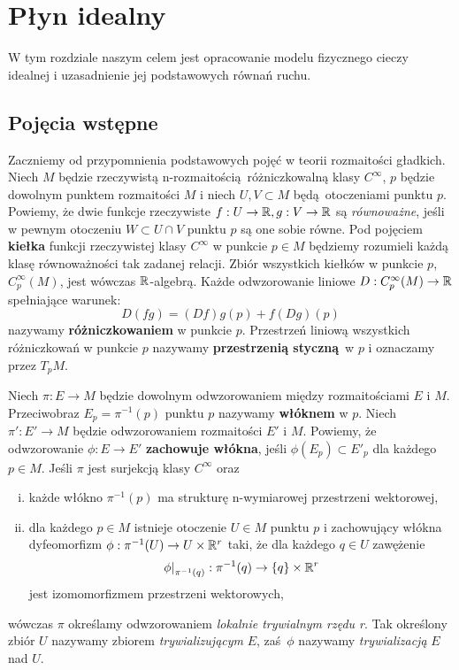 \chapter{Płyn idealny} W tym rozdziale naszym celem jest opracowanie modelu fizycznego cieczy idealnej i uzasadnienie jej podstawowych równań ruchu.

\section{Pojęcia wstępne}
Zaczniemy od przypomnienia podstawowych pojęć w teorii rozmaitości gładkich. Niech \(M\) będzie rzeczywistą n-rozmaitością różniczkowalną klasy \(C^\infty\), \(p\) będzie dowolnym punktem rozmaitości \(M\) i niech \(U, V\subset M\) będą otoczeniami punktu \(p\). Powiemy, że dwie funkcje rzeczywiste \(f:U\to\mathbb{R}, g:V\to\mathbb{R}\) są \emph{równoważne}, jeśli w pewnym otoczeniu \(W\subset U\cap V\) punktu \(p\) są one sobie równe. Pod pojęciem \textbf{kiełka} funkcji rzeczywistej klasy \(C^\infty\) w punkcie \(p\in M\) będziemy rozumieli każdą klasę równoważności tak zadanej relacji. Zbiór wszystkich kiełków w punkcie \(p\), \(C_p^\infty(M)\), jest wówczas \(\mathbb{R}\)-algebrą. Każde odwzorowanie liniowe \(D:C_p^\infty(M)\to\mathbb{R}\) spełniające warunek:
\begin{equation}
D(fg) = (Df)g(p) + f(Dg)(p)
\end{equation}
nazywamy \textbf{różniczkowaniem} w punkcie \(p\). Przestrzeń liniową wszystkich różniczkowań w punkcie \(p\) nazywamy \textbf{przestrzenią styczną} w \(p\) i oznaczamy przez \(T_pM\).

Niech \(\pi: E\to M\) będzie dowolnym odwzorowaniem między rozmaitościami \(E\) i \(M\). Przeciwobraz \(E_p = \pi^{-1}(p)\) punktu \(p\) nazywamy \textbf{włóknem} w \(p\). Niech \(\pi': E'\to M\) będzie odwzorowaniem rozmaitości \(E'\) i \(M\). Powiemy, że odwzorowanie \(\phi:E\to E'\) \textbf{zachowuje włókna}, jeśli \(\phi(E_p)\subset E'_p\) dla każdego \(p\in M\). Jeśli \(\pi\) jest surjekcją klasy \(C^\infty\) oraz
\begin{enumerate}[i)]
\item każde włókno \(\pi^{-1}(p)\) ma strukturę n-wymiarowej przestrzeni wektorowej,
\item dla każdego \(p\in M\) istnieje otoczenie \(U\in M\) punktu \(p\) i zachowujący włókna dyfeomorfizm \(\phi: \pi^{-1}(U)\to U\times \mathbb{R}^r\) taki, że dla każdego \(q\in U\) zawężenie
\begin{equation*}
\left.\phi\right|_{\pi^{-1}(q)}:\pi^{-1}(q)\to \{q\} \times \mathbb{R}^r
\end{equation*}
jest izomomorfizmem przestrzeni wektorowych,

\end{enumerate}
wówczas \(\pi\) określamy odwzorowaniem \emph{lokalnie trywialnym rzędu r}.  Tak określony zbiór \(U\) nazywamy zbiorem \emph{trywializującym} \(E\), zaś \(\phi\) nazywamy \emph{trywializacją} \(E\) nad \(U\).

